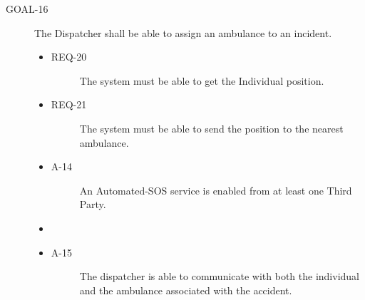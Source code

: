 \documentclass[a4paper]{article}
\newcommand{\requirement}{\ding{229}}%
\newcommand{\comment}[1]{\textbf{[Comment: #1]}}
\begin{document}
         \begin{description}
        	\item[GOAL-16] The Dispatcher shall be able to assign an ambulance to an incident.
            	\begin{itemize}
            	    \item[\requirement]
                	\begin{description}
                	\item[REQ-20] The system must be able to get the Individual position.
                	\end{description}
                	\item[\requirement]
                	\begin{description}
                	\item[REQ-21] The system must be able to send the position to the nearest ambulance.
                	\end{description}
                	\item
                	\begin{description}
                	\item[A-14] An Automated-SOS service is enabled from at least one Third Party.
                	\end{description}
                	\item
                	\item
                	\begin{description}
                	\item[A-15] The dispatcher is able to communicate with both the individual and the ambulance associated with the accident.
                	\end{description}
                	\end{itemize}
        \end{description}
        
\end{document}
